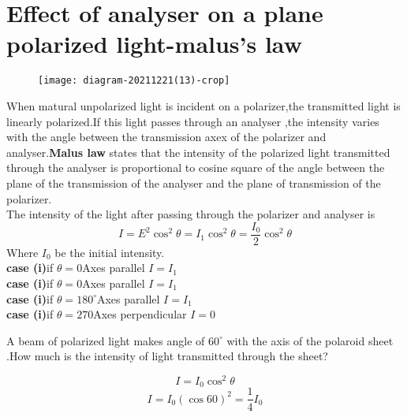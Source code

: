          \section{Effect of analyser on a plane polarized light-malus's law}
         \begin{figure}[H]
         	\centering
         	\texttt{[image: diagram-20211221(13)-crop]}
         	\caption{}
         	\label{}
         \end{figure}
     When matural unpolarized light is incident on a polarizer,the transmitted light is linearly polarized.If this light passes through an analyser ,the intensity varies with the angle between the transmission axex of the polarizer and analyser.\textbf{Malus law} states that the intensity of the polarized light transmitted through the analyser is proportional to cosine square of the angle between the plane of the transmission of the analyser and the plane of transmission of the polarizer.\\
     The intensity of the light after passing through the polarizer and analyser is \\
     $$I=E^2\cos^2\theta=I_1\cos^2\theta=\frac{I_0}{2}\cos^2\theta$$
     Where $I_0$ be the initial intensity.\\
     \textbf{case (i)}if $\theta=0$\quad \quad Axes parallel  \quad \quad $I=I_1$\\\textbf{case (i)}if $\theta=0$\quad \quad Axes parallel  \quad \quad $I=I_1$\\
 \textbf{case (i)}if $\theta=180^{\circ}$\quad \quad Axes parallel \quad \quad $I=I_1$\\
 \textbf{case (i)}if $\theta=270$\quad \quad Axes perpendicular  \quad \quad $I=0$
 \begin{exercise}
 	A beam of polarized light makes angle of $60^{\circ}$ with the axis of the polaroid sheet .How much is the intensity of light transmitted through the sheet?
 \end{exercise}
\begin{answer}
	$$I=I_0\cos^2\theta$$
	$$I=I_0(\cos60)^2=\frac{1}{4}I_0$$
\end{answer}
